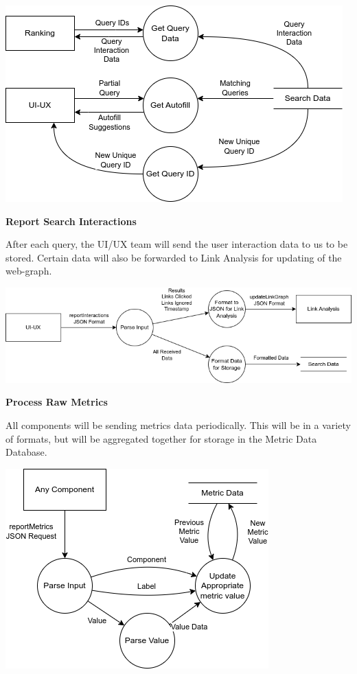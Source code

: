 \begin{center}
  \includegraphics[scale=0.5]{DFDs/LowLevelDFDs-ReadSearchData.drawio.png}
\end{center}

\textbf{Report Search Interactions}

\medskip

After each query, the UI/UX team will send the user interaction data to us to be stored. Certain data will also be forwarded to Link Analysis for updating of the web-graph.

\begin{center}
  \includegraphics[scale=0.5]{DFDs/LowLevelDFDs-ReportSearchResults.drawio (2).png}
\end{center}

\textbf{Process Raw Metrics}

\medskip

All components will be sending metrics data periodically. This will be in a variety of formats, but will be aggregated together for storage in the Metric Data Database.

\begin{center}
  \includegraphics[scale=0.5]{DFDs/LowLevelDFDs-ReportMetric.drawio (1).png}
\end{center}

